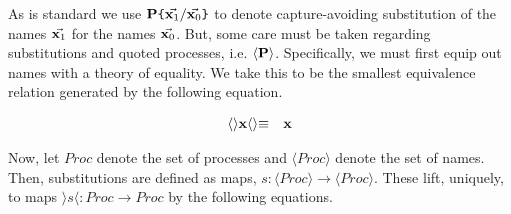 \documentclass{amsart}
\newcommand{\id}[1]{\texttt{#1}}
\newcommand{\scong}{\mathbin{\equiv}}
\newcommand{\category}[1]{\mbox{\bf #1}}
\theoremstyle{definition}
\theoremstyle{remark}
\numberwithin{equation}{subsection}
\newcommand{\lpquote}{\langle}
\newcommand{\rpquote}{\rangle}
\begin{document}
As is standard we use $\category{P}\id{\{}\vec{\category{x}_1} /
\vec{\category{x}_0} \id{\}}$ to denote capture-avoiding substitution
of the names $\vec{\category{x}_1}$ for the names
$\vec{\category{x}_0}$. But, some care must be taken regarding
substitutions and quoted processes, i.e. $\lpquote \category{P}
\rpquote$. Specifically, we must first equip out names with a theory
of equality. We take this to be the smallest equivalence relation
generated by the following equation.

\begin{eqnarray*}
\lpquote\rpquote\category{x}\lpquote\rpquote	& \scong & \category{x} \\
\end{eqnarray*}

Now, let $Proc$ denote the set of processes and
$\lpquote Proc \rpquote$ denote the set of names. Then, substitutions
are defined as maps, $s :\lpquote Proc \rpquote \rightarrow \lpquote
Proc \rpquote$. These lift, uniquely, to maps $\rpquote s \lpquote :
Proc \rightarrow Proc$ by the following equations.
\end{document}
